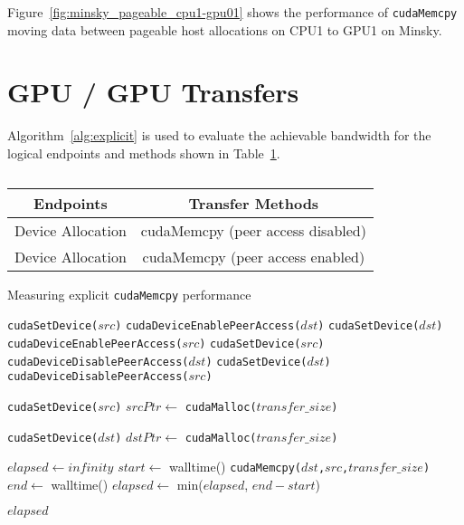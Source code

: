 Figure~\ref{fig:minsky_pageable_cpu1-gpu01} shows the performance of \texttt{cudaMemcpy} moving data between pageable host allocations on CPU1 to GPU1 on Minsky.

\section{GPU / GPU Transfers}


Algorithm~\ref{alg:explicit} is used to evaluate the achievable bandwidth for the logical endpoints and methods shown in Table~\ref{tab:explicit}.

\begin{table}[ht]
    \centering
    \caption[]{}
    \label{tab:explicit}
    \begin{tabular}{|c|c|}
    \hline
    \textbf{Endpoints} & \textbf{Transfer Methods} \\ \hline 
    Device Allocation & cudaMemcpy (peer access disabled) \\ \hline
    Device Allocation & cudaMemcpy (peer access enabled) \\ \hline
    \end{tabular}
\end{table}

\begin{algorithm}
    \caption{Measuring explicit \texttt{cudaMemcpy} performance}
    \label{alg:explicit}
    \begin{algorithmic}[1]
    \Statex
            \State \texttt{cudaSetDevice($src$)}
            \State \texttt{cudaDeviceEnablePeerAccess($dst$)}
            \State \texttt{cudaSetDevice($dst$)}
            \State \texttt{cudaDeviceEnablePeerAccess($src$)}
        \Else
            \State \texttt{cudaSetDevice($src$)}
            \State \texttt{cudaDeviceDisablePeerAccess($dst$)}
            \State \texttt{cudaSetDevice($dst$)}
            \State \texttt{cudaDeviceDisablePeerAccess($src$)}        
        \EndIf

        \State \texttt{cudaSetDevice($src$)} 
        \State $srcPtr \gets$ \texttt{cudaMalloc($transfer\_size$)}

        \State \texttt{cudaSetDevice($dst$)} 
        \State $dstPtr \gets$ \texttt{cudaMalloc($transfer\_size$)}

        \State $elapsed \gets infinity$ 
            \State $start \gets$ walltime()
            \State \texttt{cudaMemcpy($dst$,$src$,$transfer\_size$)}
            \State $end \gets$ walltime()
            \State $elapsed \gets$ min($elapsed$, $end-start$)
        \EndFor

    \Return $elapsed$
    \EndFunction

    \end{algorithmic}
\end{algorithm}

